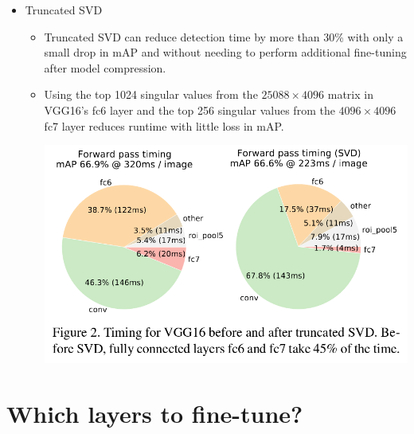 \documentclass[11pt]{book}
\begin{document}
\begin{itemize}

\item Truncated SVD\\
\label{sec-1-3-4-1}%
\begin{itemize}
\item Truncated SVD can reduce detection time by more than 30\% with only a small drop 
       in mAP and without needing to perform additional fine-tuning after model compression.
\item Using the top 1024 singular values from the $25088\times{4096}$ matrix in VGG16's fc6 layer
       and the top 256 singular values from the $4096\times{4096}$ fc7 layer reduces runtime
       with little loss in mAP.

       \includegraphics[width=.9\linewidth]{./pic_fast_rcnn/2.png}
\end{itemize}


\end{itemize} %
\section{Which layers to fine-tune?}
\label{sec-1-3-5}
\end{document}
